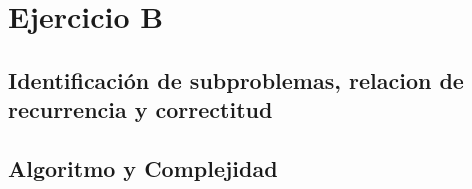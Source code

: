 \section{Ejercicio B}

\subsection{Identificación de subproblemas, relacion de recurrencia y correctitud}




\subsection{Algoritmo y Complejidad}




